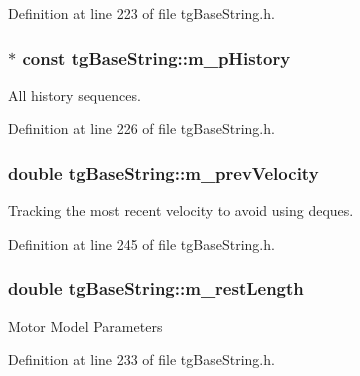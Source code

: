 Definition at line 223 of file tg\-Base\-String.\-h.

\hypertarget{classtg_base_string_ab50177e75064ed5863e497cad34df60a}{
\subsubsection[{m\-\_\-p\-History}]{$\ast$ const tg\-Base\-String\-::m\-\_\-p\-History\hspace{0.3cm}{\ttfamily [protected]}}}\label{classtg_base_string_ab50177e75064ed5863e497cad34df60a}
All history sequences. 

Definition at line 226 of file tg\-Base\-String.\-h.

\hypertarget{classtg_base_string_af54d1188ce7eb296b3b1df2224286424}{
\subsubsection[{m\-\_\-prev\-Velocity}]{\setlength{\rightskip}{0pt plus 5cm}double tg\-Base\-String\-::m\-\_\-prev\-Velocity\hspace{0.3cm}{\ttfamily [protected]}}}\label{classtg_base_string_af54d1188ce7eb296b3b1df2224286424}
Tracking the most recent velocity to avoid using deques. 

Definition at line 245 of file tg\-Base\-String.\-h.

\hypertarget{classtg_base_string_a7e5cf579c266faed950ee215bf1bc596}{
\subsubsection[{m\-\_\-rest\-Length}]{\setlength{\rightskip}{0pt plus 5cm}double tg\-Base\-String\-::m\-\_\-rest\-Length\hspace{0.3cm}{\ttfamily [protected]}}}\label{classtg_base_string_a7e5cf579c266faed950ee215bf1bc596}
Motor Model Parameters 

Definition at line 233 of file tg\-Base\-String.\-h.

